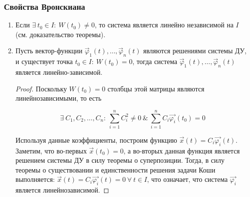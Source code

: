 \subsubsection{Свойства Вронскиана}

\begin{enumerate}
    \item Если $\exists ~ t_0 \in I : ~ W(t_0) \neq 0$, то система является линейно независимой на $I$ (см. доказательство теоремы).
    \item Пусть вектор-функции $\vec \varphi_1(t), \dots, \vec \varphi_n(t)$ являются решениями системы ДУ, и существует точка
    $t_0 \in I: ~ W(t_0) = 0$, тогда система $\vec \varphi_1(t), \dots, \vec \varphi_n(t)$ является линейно-зависимой.

    \begin{proof}
        Поскольку $W(t_0) = 0$ столбцы этой матрицы являются линейнозависимыми, то есть 
        
        \[ \exists ~ C_1, C_2, \dots, C_n : ~ \sum_{i = 1}^n C_i^2 \neq 0 ~ \& ~ \sum_{i = 1}^n C_i \vec{\varphi_i}(t_0) = 0 \]
        
        Используя данные коэффициенты, построим функцию $\vec{x}(t) = C_i \vec{\varphi_i}(t)$. Заметим, что во-первых $\vec{x}(t_0) = 0$, а во-вторых данная функция является решением системы ДУ в силу теоремы о суперпозиции. Тогда, в силу теоремы о существовании и единственности решения задачи Коши выполняется: $\vec{x}(t) = C_i \vec{\varphi_i}(t) = 0 ~ \forall ~ t \in I$, что означает, что система $\vec{\varphi_i}$ является линейнозависимой.
    \end{proof}
\end{enumerate}